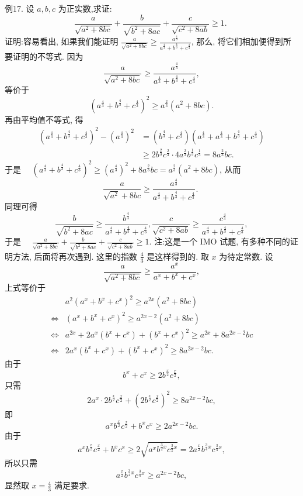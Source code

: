 例17. 设 $a, b, c$ 为正实数,求证:
$$
\frac{a}{\sqrt{a^2+8 b c}}+\frac{b}{\sqrt{b^2+8 a c}}+\frac{c}{\sqrt{c^2+8 a b}} \geqslant 1 \text {. }
$$
证明:容易看出, 如果我们能证明 $\frac{a}{\sqrt{a^2+8 b c}} \geqslant \frac{a^{\frac{4}{3}}}{a^{\frac{4}{3}}+b^{\frac{4}{3}}+c^{\frac{4}{3}}}$, 那么, 将它们相加便得到所要证明的不等式.
因为
$$
\frac{a}{\sqrt{a^2+8 b c}} \geqslant \frac{a^{\frac{4}{3}}}{a^{\frac{4}{3}}+b^{\frac{4}{3}}+c^{\frac{4}{3}}},
$$
等价于
$$
\left(a^{\frac{4}{3}}+b^{\frac{4}{3}}+c^{\frac{4}{3}}\right)^2 \geqslant a^{\frac{2}{3}}\left(a^2+8 b c\right) .
$$
再由平均值不等式, 得
$$
\begin{aligned}
\left(a^{\frac{4}{3}}+b^{\frac{4}{3}}+c^{\frac{4}{3}}\right)^2-\left(a^{\frac{4}{3}}\right)^2 & =\left(b^{\frac{4}{3}}+c^{\frac{4}{3}}\right)\left(a^{\frac{4}{3}}+a^{\frac{4}{3}}+b^{\frac{4}{3}}+c^{\frac{4}{3}}\right) \\
& \geqslant 2 b^{\frac{2}{3}} c^{\frac{2}{3}} \cdot 4 a^{\frac{2}{3}} b^{\frac{1}{3}} c^{\frac{1}{3}}=8 a^{\frac{2}{3}} b c .
\end{aligned}
$$
于是 $\quad\left(a^{\frac{4}{3}}+b^{\frac{4}{3}}+c^{\frac{4}{3}}\right)^2 \geqslant\left(a^{\frac{4}{3}}\right)^2+8 a^{\frac{2}{3}} b c=a^{\frac{2}{3}}\left(a^2+8 b c\right)$,
从而
$$
\frac{a}{\sqrt{a^2}+8 b c} \geqslant \frac{a^{\frac{4}{3}}}{a^{\frac{4}{3}}+b^{\frac{4}{3}}+c^{\frac{4}{3}}} \text {. }
$$
同理可得
$$
\frac{b}{\sqrt{b^2+8 a c}} \geqslant \frac{b^{\frac{4}{3}}}{a^{\frac{4}{3}}+b^{\frac{4}{3}}+c^{\frac{4}{3}}}, \frac{c}{\sqrt{c^2+8 a b}} \geqslant \frac{c^{\frac{4}{3}}}{a^{\frac{4}{3}}+b^{\frac{4}{3}}+c^{\frac{4}{3}}},
$$
于是 $\quad \frac{a}{\sqrt{a^2+8 b c}}+\frac{b}{\sqrt{b^2+8 a c}}+\frac{c}{\sqrt{c^2+8 a b}} \geqslant 1$.
注:这是一个 IMO 试题, 有多种不同的证明方法, 后面将再次遇到.
这里的指数 $\frac{4}{3}$ 是这样得到的.
取 $x$ 为待定常数.
设
$$
\frac{a}{\sqrt{a^2+8 b c}} \geqslant \frac{a^x}{a^x+b^x+c^x},
$$
上式等价于
$$
\begin{aligned}
& a^2\left(a^x+b^x+c^x\right)^2 \geqslant a^{2 x}\left(a^2+8 b c\right) \\
\Leftrightarrow & \left(a^x+b^x+c^x\right)^2 \geqslant a^{2 x-2}\left(a^2+8 b c\right) \\
\Leftrightarrow & a^{2 x}+2 a^x\left(b^x+c^x\right)+\left(b^x+c^x\right)^2 \geqslant a^{2 x}+8 a^{2 x-2} b c \\
\Leftrightarrow & 2 a^x\left(b^x+c^x\right)+\left(b^x+c^x\right)^2 \geqslant 8 a^{2 x-2} b c .
\end{aligned}
$$
由于
$$
b^x+c^x \geqslant 2 b^{\frac{x}{2}} c^{\frac{x}{2}},
$$
只需
$$
2 a^x \cdot 2 b^{\frac{x}{2}} c^{\frac{x}{2}}+\left(2 b^{\frac{x}{2}} c^{\frac{x}{2}}\right)^2 \geqslant 8 a^{2 x-2} b c,
$$
即
$$
a^x b^{\frac{x}{2}} c^{\frac{x}{2}}+b^x c^x \geqslant 2 a^{2 x-2} b c .
$$
由于
$$
a^x b^{\frac{x}{2}} c^{\frac{x}{2}}+b^x c^x \geqslant 2 \sqrt{a^x b^{\frac{3}{2} x} c^{\frac{3}{2} x}}=2 a^{\frac{x}{2}} b^{\frac{3}{4} x} c^{\frac{3}{4} x},
$$
所以只需
$$
a^{\frac{x}{2}} b^{\frac{3}{4} x} c^{\frac{3}{4} x} \geqslant a^{2 x-2} b c,
$$
显然取 $x=\frac{4}{3}$ 满足要求.



